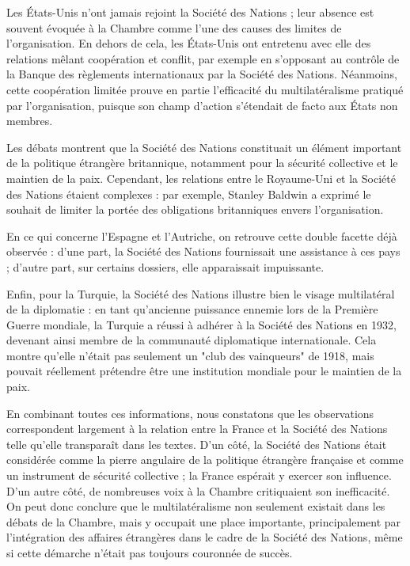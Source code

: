 \documentclass[a4paper,twoside,12pt]{book}
\begin{document}
Les États-Unis n'ont jamais rejoint la Société des Nations ; leur absence est souvent évoquée à la Chambre comme l'une des causes des limites de l'organisation. En dehors de cela, les États-Unis ont entretenu avec elle des relations mêlant coopération et conflit, par exemple en s'opposant au contrôle de la Banque des règlements internationaux par la Société des Nations. Néanmoins, cette coopération limitée prouve en partie l'efficacité du multilatéralisme pratiqué par l'organisation, puisque son champ d'action s'étendait de facto aux États non membres.

Les débats montrent que la Société des Nations constituait un élément important de la politique étrangère britannique, notamment pour la sécurité collective et le maintien de la paix. Cependant, les relations entre le Royaume-Uni et la Société des Nations étaient complexes : par exemple, Stanley Baldwin a exprimé le souhait de limiter la portée des obligations britanniques envers l'organisation.

En ce qui concerne l'Espagne et l'Autriche, on retrouve cette double facette déjà observée : d'une part, la Société des Nations fournissait une assistance à ces pays ; d'autre part, sur certains dossiers, elle apparaissait impuissante.

Enfin, pour la Turquie, la Société des Nations illustre bien le visage multilatéral de la diplomatie : en tant qu'ancienne puissance ennemie lors de la Première Guerre mondiale, la Turquie a réussi à adhérer à la Société des Nations en 1932, devenant ainsi membre de la communauté diplomatique internationale. Cela montre qu'elle n'était pas seulement un "club des vainqueurs" de 1918, mais pouvait réellement prétendre être une institution mondiale pour le maintien de la paix.

En combinant toutes ces informations, nous constatons que les observations correspondent largement à la relation entre la France et la Société des Nations telle qu'elle transparaît dans les textes. D'un côté, la Société des Nations était considérée comme la pierre angulaire de la politique étrangère française et comme un instrument de sécurité collective ; la France espérait y exercer son influence. D'un autre côté, de nombreuses voix à la Chambre critiquaient son inefficacité. On peut donc conclure que le multilatéralisme non seulement existait dans les débats de la Chambre, mais y occupait une place importante, principalement par l'intégration des affaires étrangères dans le cadre de la Société des Nations, même si cette démarche n'était pas toujours couronnée de succès.
\end{document}
